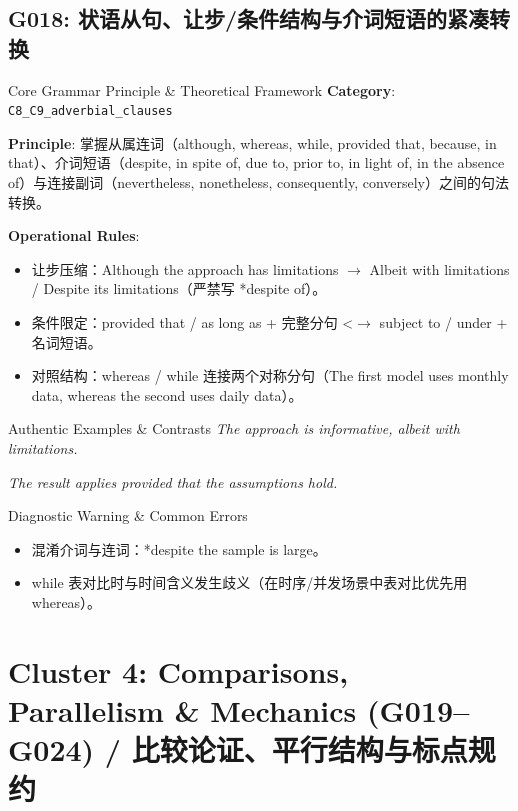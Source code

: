 \subsection{G018: 状语从句、让步/条件结构与介词短语的紧凑转换}\label{sec:rule:G018}
\begin{ConceptBox}{Core Grammar Principle \& Theoretical Framework}
\textbf{Category}: \texttt{C8\_C9\_adverbial\_clauses}\par\vspace{3pt}
\textbf{Principle}: 掌握从属连词（although, whereas, while, provided that, because, in that）、介词短语（despite, in spite of, due to, prior to, in light of, in the absence of）与连接副词（nevertheless, nonetheless, consequently, conversely）之间的句法转换。\par\vspace{4pt}
\textbf{Operational Rules}:
\begin{itemize}[leftmargin=1.5em, itemsep=1pt]
  \item 让步压缩：Although the approach has limitations $\to$ Albeit with limitations / Despite its limitations（严禁写 *despite of）。
  \item 条件限定：provided that / as long as + 完整分句 <$\to$ subject to / under + 名词短语。
  \item 对照结构：whereas / while 连接两个对称分句（The first model uses monthly data, whereas the second uses daily data）。
\end{itemize}
\end{ConceptBox}
\begin{ExampleBox}{Authentic Examples \& Contrasts}
\textit{The approach is informative, albeit with limitations.}\par\vspace{2pt}
\textit{The result applies provided that the assumptions hold.}\par\vspace{2pt}
\end{ExampleBox}
\begin{TipBox}{Diagnostic Warning \& Common Errors}
\begin{itemize}[leftmargin=1.5em, itemsep=1pt]
  \item 混淆介词与连词：*despite the sample is large。
  \item while 表对比时与时间含义发生歧义（在时序/并发场景中表对比优先用 whereas）。
\end{itemize}
\end{TipBox}
\vspace{6pt}
\section{Cluster 4: Comparisons, Parallelism \& Mechanics (G019--G024) / 比较论证、平行结构与标点规约}
